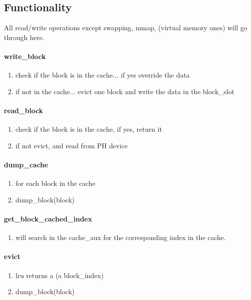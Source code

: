\subsection{Functionality}
All read/write operations except swapping, mmap, (virtual memory ones) will go through here.  

\paragraph {write\_block}
\begin{enumerate}
	\item check if the block is in the cache... if yes override the data
	\item if not in the cache... evict one block and write the data in the block\_slot
\end{enumerate}

\paragraph {read\_block}
\begin{enumerate}
	\item check if the block is in the cache, if yes, return it
	\item if not evict, and read from PH device
\end{enumerate}

\paragraph {dump\_cache}
\begin{enumerate}
	\item for each block in the cache
	\item dump\_block(block)
\end{enumerate}


\paragraph {get\_block\_cached\_index}
\begin{enumerate}
	\item will search in the cache\_aux for the corresponding index in the cache.
\end{enumerate}

\paragraph {evict}
\begin{enumerate}
	\item lru returns a (a block\_index)
	\item dump\_block(block)
\end{enumerate}

